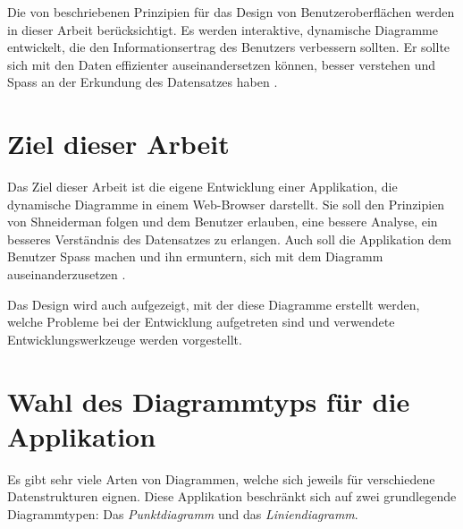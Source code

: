Die von \citeauthor{shneiderman} beschriebenen Prinzipien für das Design von Benutzeroberflächen werden in dieser Arbeit berücksichtigt. Es werden interaktive, dynamische Diagramme entwickelt, die den Informationsertrag des Benutzers verbessern sollten. Er sollte sich mit den Daten effizienter auseinandersetzen können, besser verstehen und Spass an der Erkundung des Datensatzes haben \cite{shneiderman}.

\section{Ziel dieser Arbeit}

Das Ziel dieser Arbeit ist die eigene Entwicklung einer Applikation, die dynamische Diagramme in einem Web-Browser darstellt. Sie soll den Prinzipien von Shneiderman folgen und dem Benutzer erlauben, eine bessere Analyse, ein besseres Verständnis des Datensatzes zu erlangen. Auch soll die Applikation dem Benutzer Spass machen und ihn ermuntern, sich mit dem Diagramm auseinanderzusetzen \cite{shneiderman}.

Das Design wird auch aufgezeigt, mit der diese Diagramme erstellt werden, welche Probleme bei der Entwicklung aufgetreten sind und verwendete Entwicklungswerkzeuge werden vorgestellt.

\section{Wahl des Diagrammtyps für die Applikation}

Es gibt sehr viele Arten von Diagrammen, welche sich jeweils für verschiedene Datenstrukturen eignen. 
Diese Applikation beschränkt sich auf zwei grundlegende Diagrammtypen: Das \textit{Punktdiagramm} und das \textit{Liniendiagramm}.

